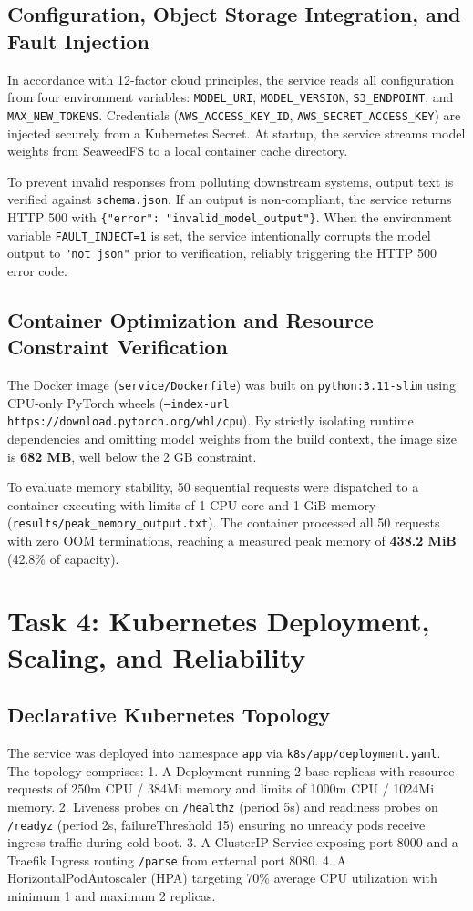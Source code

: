 \documentclass[10pt,a4paper]{article}
\begin{document}
\subsection{Configuration, Object Storage Integration, and Fault Injection}
In accordance with 12-factor cloud principles, the service reads all configuration from four environment variables: \texttt{MODEL\_URI}, \texttt{MODEL\_VERSION}, \texttt{S3\_ENDPOINT}, and \texttt{MAX\_NEW\_TOKENS}. Credentials (\texttt{AWS\_ACCESS\_KEY\_ID}, \texttt{AWS\_SECRET\_ACCESS\_KEY}) are injected securely from a Kubernetes Secret. At startup, the service streams model weights from SeaweedFS to a local container cache directory. 

To prevent invalid responses from polluting downstream systems, output text is verified against \texttt{schema.json}. If an output is non-compliant, the service returns HTTP 500 with \texttt{\{"error": "invalid\_model\_output"\}}. When the environment variable \texttt{FAULT\_INJECT=1} is set, the service intentionally corrupts the model output to \texttt{"not json"} prior to verification, reliably triggering the HTTP 500 error code.

\subsection{Container Optimization and Resource Constraint Verification}
The Docker image (\texttt{service/Dockerfile}) was built on \texttt{python:3.11-slim} using CPU-only PyTorch wheels (\texttt{--index-url https://download.pytorch.org/whl/cpu}). By strictly isolating runtime dependencies and omitting model weights from the build context, the image size is \textbf{682 MB}, well below the 2 GB constraint.

To evaluate memory stability, 50 sequential requests were dispatched to a container executing with limits of 1 CPU core and 1 GiB memory (\texttt{results/peak\_memory\_output.txt}). The container processed all 50 requests with zero OOM terminations, reaching a measured peak memory of \textbf{438.2 MiB} (42.8\% of capacity).

\section{Task 4: Kubernetes Deployment, Scaling, and Reliability}
\subsection{Declarative Kubernetes Topology}
The service was deployed into namespace \texttt{app} via \texttt{k8s/app/deployment.yaml}. The topology comprises:
1. A Deployment running 2 base replicas with resource requests of 250m CPU / 384Mi memory and limits of 1000m CPU / 1024Mi memory.
2. Liveness probes on \texttt{/healthz} (period 5s) and readiness probes on \texttt{/readyz} (period 2s, failureThreshold 15) ensuring no unready pods receive ingress traffic during cold boot.
3. A ClusterIP Service exposing port 8000 and a Traefik Ingress routing \texttt{/parse} from external port 8080.
4. A HorizontalPodAutoscaler (HPA) targeting 70\% average CPU utilization with minimum 1 and maximum 2 replicas.
\end{document}
